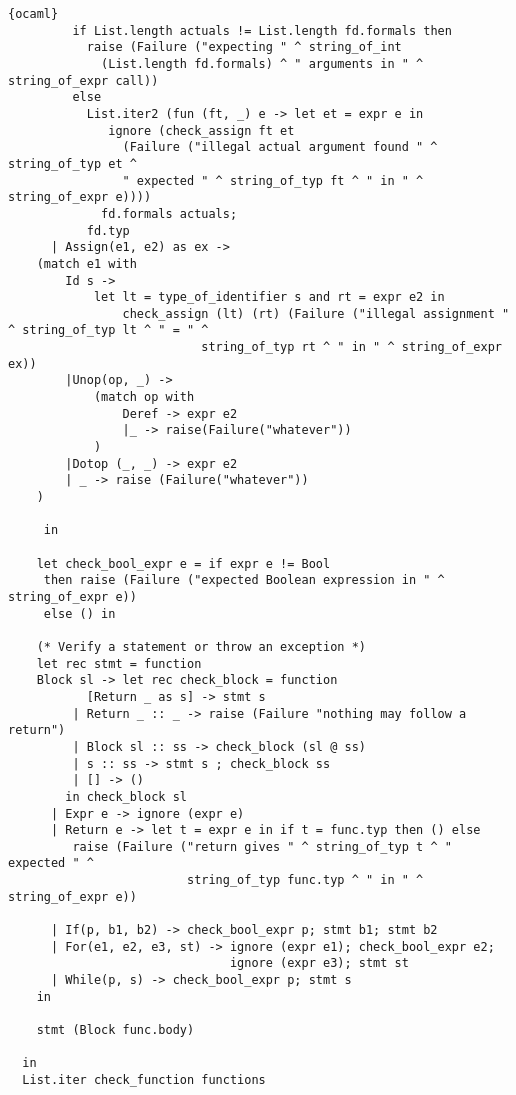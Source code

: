\begin{lstlisting}{ocaml}
         if List.length actuals != List.length fd.formals then
           raise (Failure ("expecting " ^ string_of_int
             (List.length fd.formals) ^ " arguments in " ^ string_of_expr call))
         else
           List.iter2 (fun (ft, _) e -> let et = expr e in
              ignore (check_assign ft et
                (Failure ("illegal actual argument found " ^ string_of_typ et ^
                " expected " ^ string_of_typ ft ^ " in " ^ string_of_expr e))))
             fd.formals actuals;
           fd.typ
      | Assign(e1, e2) as ex ->
	(match e1 with
		Id s -> 
 			let lt = type_of_identifier s and rt = expr e2 in
     			check_assign (lt) (rt) (Failure ("illegal assignment " ^ string_of_typ lt ^ " = " ^
                           string_of_typ rt ^ " in " ^ string_of_expr ex))
		|Unop(op, _) ->
			(match op with 
				Deref -> expr e2
				|_ -> raise(Failure("whatever"))
			)
		|Dotop (_, _) -> expr e2
		| _ -> raise (Failure("whatever"))
	)

     in

    let check_bool_expr e = if expr e != Bool
     then raise (Failure ("expected Boolean expression in " ^ string_of_expr e))
     else () in

    (* Verify a statement or throw an exception *)
    let rec stmt = function
	Block sl -> let rec check_block = function
           [Return _ as s] -> stmt s
         | Return _ :: _ -> raise (Failure "nothing may follow a return")
         | Block sl :: ss -> check_block (sl @ ss)
         | s :: ss -> stmt s ; check_block ss
         | [] -> ()
        in check_block sl
      | Expr e -> ignore (expr e)
      | Return e -> let t = expr e in if t = func.typ then () else
         raise (Failure ("return gives " ^ string_of_typ t ^ " expected " ^
                         string_of_typ func.typ ^ " in " ^ string_of_expr e))
           
      | If(p, b1, b2) -> check_bool_expr p; stmt b1; stmt b2
      | For(e1, e2, e3, st) -> ignore (expr e1); check_bool_expr e2;
                               ignore (expr e3); stmt st
      | While(p, s) -> check_bool_expr p; stmt s
    in

    stmt (Block func.body)
   
  in
  List.iter check_function functions
\end{lstlisting}
